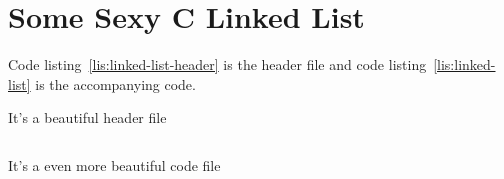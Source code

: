 \documentclass{article}
\begin{document}
\section{Some Sexy C Linked List}
Code listing~\ref{lis:linked-list-header} is the header file and code listing~\ref{lis:linked-list}
is the accompanying code.

\begin{listing}[]
  \centering
  \caption{It's a beautiful header file}
  \inputminted[linenos, frame=lines]{c}{LinkedList.h}
  \label{lis:linked-list-header}
\end{listing}

\begin{listing}[]
  \centering
  \caption{It's a even more beautiful code file}
  \inputminted[linenos, frame=lines, lastline=50]{c}{LinkedList.c}
  \label{lis:linked-list}
\end{listing}
\end{document}

